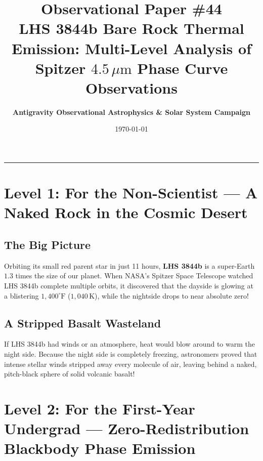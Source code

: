 \documentclass[11pt,a4paper]{article}
\title{\Huge \textbf{Observational Paper \#44}\\ \Large LHS 3844b Bare Rock Thermal Emission: Multi-Level Analysis of Spitzer $4.5\,\mu\text{m}$ Phase Curve Observations}
\author{\textbf{Antigravity Observational Astrophysics \& Solar System Campaign}}
\date{\today}
\begin{document}
\maketitle

\vspace{-1em}
\begin{center}
\rule{\textwidth}{1.5pt}
\end{center}

\section*{Level 1: For the Non-Scientist — A Naked Rock in the Cosmic Desert}

\subsection*{The Big Picture}
Orbiting its small red parent star in just 11 hours, \textbf{LHS 3844b} is a super-Earth $1.3$ times the size of our planet. When NASA's Spitzer Space Telescope watched LHS 3844b complete multiple orbits, it discovered that the dayside is glowing at a blistering \textbf{$1,400^\circ\text{F}$} ($1,040\,\text{K}$), while the nightside drops to near absolute zero!

\subsection*{A Stripped Basalt Wasteland}
If LHS 3844b had winds or an atmosphere, heat would blow around to warm the night side. Because the night side is completely freezing, astronomers proved that intense stellar winds stripped away every molecule of air, leaving behind a naked, pitch-black sphere of solid volcanic basalt!

\newpage

\section*{Level 2: For the First-Year Undergrad — Zero-Redistribution Blackbody Phase Emission}
\end{document}
